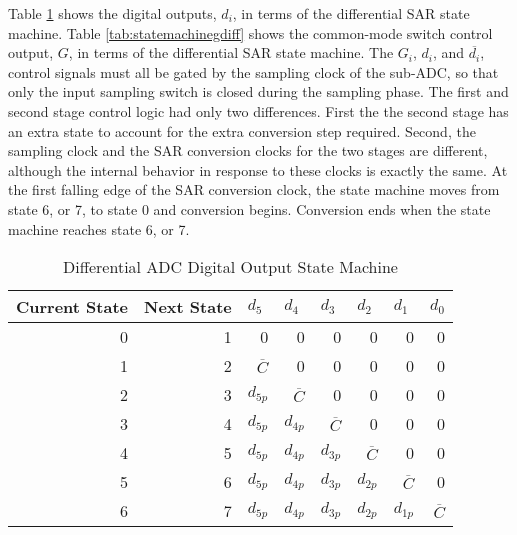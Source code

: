 Table \ref{tab:statemachinedoutdiff} shows the digital outputs, $d_{i}$, in terms of the differential SAR state machine. Table \ref{tab:statemachinegdiff} shows the common-mode switch control output, $G$, in terms of the differential SAR state machine. The $G_{i}$, $d_{i}$, and $\overline{d_{i}}$, control signals must all be gated by the sampling clock of the sub-ADC, so that only the input sampling switch is closed during the sampling phase. The first and second stage control logic had only two differences. First the the second stage has an extra state to account for the extra conversion step required. Second, the sampling clock and the SAR conversion clocks for the two stages are different, although the internal behavior in response to these clocks is exactly the same. At the first falling edge of the SAR conversion clock, the state machine moves from state 6, or 7, to state 0 and conversion begins. Conversion ends when the state machine reaches state 6, or 7.
\begin{table}[htbp]
\renewcommand*\arraystretch{1.3}
\begin{center}
\begin{tabular}{|r|r|r|r|l|r|r|r|}
\hline
\multicolumn{1}{|l|}{Current State} & \multicolumn{1}{l|}{Next State} & \multicolumn{1}{l|}{$d_{5}$} & \multicolumn{1}{l|}{$d_{4}$} & $d_{3}$ & \multicolumn{1}{l|}{$d_{2}$} & \multicolumn{1}{l|}{$d_{1}$} & \multicolumn{1}{l|}{$d_{0}$} \\ \hline
0 & 1 & 0 & 0 & \multicolumn{1}{r|}{0} & 0 & 0 & 0 \\ \hline
1 & 2 & $\overline{C}$ & 0 & \multicolumn{1}{r|}{0} & 0 & 0 & 0 \\ \hline
2 & 3 & $d_{5p}$ & $\overline{C}$ & \multicolumn{1}{r|}{0} & 0 & 0 & 0 \\ \hline
3 & 4 & $d_{5p}$ & $d_{4p}$ & \multicolumn{1}{r|}{$\overline{C}$} & 0 & 0 & 0 \\ \hline
4 & 5 & $d_{5p}$ & $d_{4p}$ & $d_{3p}$ & $\overline{C}$ & 0 & 0 \\ \hline
5 & 6 & $d_{5p}$ & $d_{4p}$ & $d_{3p}$ & \multicolumn{1}{l|}{$d_{2p}$} & $\overline{C}$ & 0 \\ \hline
6 & 7 & $d_{5p}$ & $d_{4p}$ & $d_{3p}$ & \multicolumn{1}{l|}{$d_{2p}$} & \multicolumn{1}{l|}{$d_{1p}$} & $\overline{C}$ \\ \hline
\end{tabular}
\end{center}
\caption{Differential ADC Digital Output State Machine}
\label{tab:statemachinedoutdiff}
\end{table}


